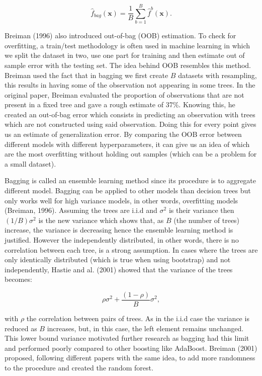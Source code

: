 \documentclass[a4paper,12pt]{article}
\numberwithin{equation}{section}
\begin{document}
\begin{equation}\label{eq:9}
\hat{f}_{bag}(\boldsymbol{x})= \frac{1}{B}\sum_{b=1}^B\hat{f}^b(\boldsymbol{x}).
\end{equation}

Breiman (1996) also introduced out-of-bag (OOB) estimation. To check for overfitting, a train/test methodology is often used in machine learning in which we split the dataset in two, use one part for training and then estimate out of sample error with the testing set. The idea behind OOB resembles this method. Breiman used the fact that in bagging we first create $B$ datasets with resampling, this results in having some of the observation not appearing in some trees. In the original paper, Breiman evaluated the proportion of observations that are not present in a fixed tree and gave a rough estimate of 37\%. Knowing this, he created an out-of-bag error which consists in predicting an observation with trees which are not constructed using said observation. Doing this for every point gives us an estimate of generalization error. By comparing the OOB error between different models with different hyperparameters, it can give us an idea of which are the most overfitting without holding out samples (which can be a problem for a small dataset).

Bagging is called an ensemble learning method since its procedure is to aggregate different model. Bagging can be applied to other models than decision trees but only works well for high variance models, in other words, overfitting models (Breiman, 1996). Assuming the trees are i.i.d and $\sigma^2$ is their variance then $(1/B)\sigma^2$ is the new variance which shows that, as $B$ (the number of trees) increase, the variance is decreasing hence the ensemble learning method is justified. However the independently distributed, in other words, there is no correlation between each tree, is a strong assumption. In cases where the trees are only identically distributed (which is true when using bootstrap) and not independently, Hastie and al. (2001) showed that the variance of the trees becomes:

\begin{equation}\label{eq:10}
\rho\sigma^2 + \frac{(1-\rho)}{B}\sigma^2,
\end{equation}

\noindent
with $\rho$ the correlation between pairs of trees. As in the i.i.d case the variance is reduced as $B$ increases, but, in this case, the left element remains unchanged. This lower bound variance motivated further research as bagging had this limit and performed poorly compared to other boosting like AdaBoost. Breiman (2001) proposed, following different papers with the same idea, to add more randomness to the procedure and created the random forest. 
\end{document}
